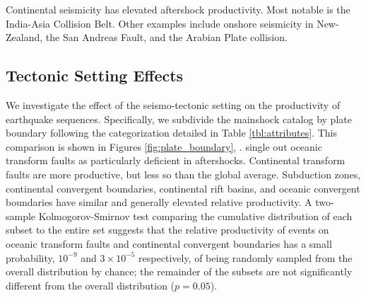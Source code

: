 \documentclass[draft, jgrga]{agujournal2018}
\begin{document}
    Continental seismicity has elevated aftershock productivity. Most notable is the India-Asia Collision Belt. Other examples include onshore seismicity in New-Zealand, the San Andreas Fault, and the Arabian Plate collision.
    
    \subsection{Tectonic Setting Effects}\label{sec:tectonic_setting}
    
    We investigate the effect of the seismo-tectonic setting on the productivity of earthquake sequences. Specifically, we subdivide the mainshock catalog by plate boundary following the categorization detailed in Table \ref{tbl:attributes}. This comparison is shown in Figures \ref{fig:plate_boundary}, .  single out oceanic transform faults as particularly deficient in aftershocks. Continental transform faults are more productive, but less so than the global average. Subduction zones, continental convergent boundaries, continental rift basins, and oceanic convergent boundaries have similar and generally elevated relative productivity. A two-sample Kolmogorov-Smirnov test comparing the cumulative distribution of each subset to the entire set suggests that the relative productivity of events on oceanic transform faults and continental convergent boundaries has a small probability, $10^{-9}$ and $3\times10^{-5}$ respectively, of being randomly sampled from the overall distribution by chance; the remainder of the subsets are not significantly different from the overall distribution ($p = 0.05$). 
    
\end{document}
